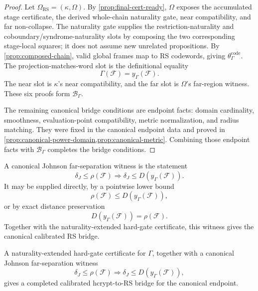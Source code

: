 \begin{proof}
Let \(\Omega_{\mathrm{RS}}=(\kappa,\Omega)\). By
\cref{prop:final-cert-ready}, \(\Omega\) exposes the accumulated stage
certificate, the derived whole-chain naturality gate, near compatibility, and
far non-collapse. The naturality gate supplies the restriction-naturality and
coboundary/syndrome-naturality slots by composing the two corresponding
stage-local squares; it does not assume new unrelated propositions. By
\cref{prop:composed-chain}, valid global frames map to RS codewords, giving
\(\theta^{\mathrm{code}}_\Gamma\). The projection-matches-word slot is the
definitional equality
\[
  \Gamma(\mathcal F)=y_\Gamma(\mathcal F).
\]
The near slot is \(\kappa\)'s near compatibility, and the far slot is
\(\Omega\)'s far-region witness. These six proofs form
\(\mathcal B_\Gamma\).

The remaining canonical bridge conditions are endpoint facts: domain
cardinality, smoothness, evaluation-point compatibility, metric normalization,
and radius matching. They were fixed in the canonical endpoint data and proved
in \cref{prop:canonical-power-domain,prop:canonical-metric}. Combining those
endpoint facts with \(\mathcal B_\Gamma\) completes the bridge conditions.
\end{proof}

A canonical Johnson far-separation witness is the statement
\[
  \delta_J\le \rho(\mathcal F)
  \Longrightarrow
  \delta_J\le D(y_\Gamma(\mathcal F)).
\]
It may be supplied directly, by a pointwise lower bound
\[
  \rho(\mathcal F)\le D(y_\Gamma(\mathcal F)),
\]
or by exact distance preservation
\[
  D(y_\Gamma(\mathcal F))=\rho(\mathcal F).
\]
Together with the naturality-extended hard-gate certificate, this witness gives
the canonical calibrated RS bridge.

\begin{proposition}\label{prop:canonical-bridge}
A naturality-extended hard-gate certificate for \(\Gamma\), together with a
canonical Johnson far-separation witness
\[
  \delta_J\le \rho(\mathcal F)
  \Longrightarrow
  \delta_J\le D(y_\Gamma(\mathcal F)),
\]
gives a completed calibrated hcrypt-to-RS bridge for the canonical endpoint.
\end{proposition}


